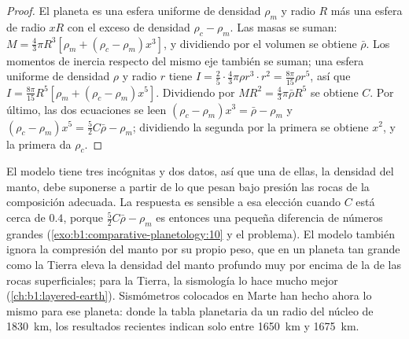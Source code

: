 \begin{proof}
El planeta es una esfera uniforme de densidad $\rho_m$ y radio $R$ más una esfera de radio $xR$
con el exceso de densidad $\rho_c - \rho_m$. Las masas se suman: $M = \tfrac43\pi R^3[\rho_m + (\rho_c - \rho_m)x^3]$, y dividiendo por el volumen se obtiene $\bar\rho$. Los momentos de inercia
respecto del mismo eje también se suman; una esfera uniforme de densidad $\rho$ y radio $r$ tiene
$I = \tfrac25\cdot\tfrac43\pi\rho r^3\cdot r^2 = \tfrac{8\pi}{15}\rho r^5$, así que
$I = \tfrac{8\pi}{15}R^5[\rho_m + (\rho_c - \rho_m)x^5]$. Dividiendo por
$MR^2 = \tfrac43\pi\bar\rho R^5$ se obtiene $C$. Por último, las dos ecuaciones se leen
$(\rho_c - \rho_m)x^3 = \bar\rho - \rho_m$ y $(\rho_c - \rho_m)x^5 =
\tfrac52C\bar\rho - \rho_m$; dividiendo la segunda por la primera se obtiene $x^2$, y la primera
da $\rho_c$.
\end{proof}

El modelo tiene tres incógnitas y dos datos, así que una de ellas, la densidad del manto, debe
suponerse a partir de lo que pesan bajo presión las rocas de la composición adecuada. La
respuesta es sensible a esa elección cuando $C$ está cerca de $0.4$, porque
$\tfrac52C\bar\rho - \rho_m$ es entonces una pequeña diferencia de números grandes
(\cref{exo:b1:comparative-planetology:10} y el problema). El modelo también ignora la compresión
del manto por su propio peso, que en un planeta tan grande como la Tierra eleva la densidad del
manto profundo muy por encima de la de las rocas superficiales; para la Tierra, la sismología lo
hace mucho mejor (\cref{ch:b1:layered-earth}). Sismómetros colocados en Marte han hecho ahora lo
mismo para ese planeta: donde la tabla planetaria da un radio del núcleo de \qty{1830}{km},
los resultados recientes indican solo entre \qty{1650}{km} y \qty{1675}{km}.

